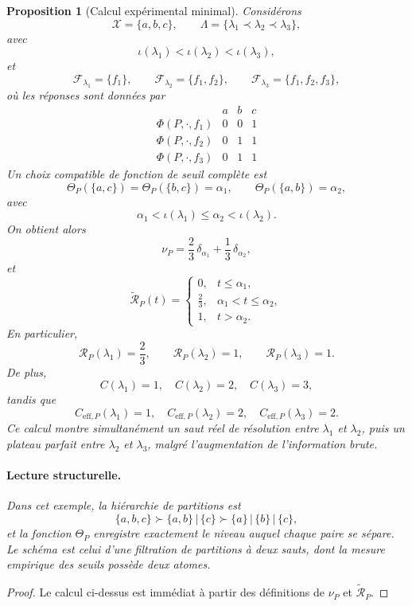 \documentclass[11pt,a4paper,openany]{book}
\newtheorem{proposition}[definition]{Proposition}
\begin{document}
\begin{proposition}[Calcul expérimental minimal]
Considérons
\[
\mathcal X=\{a,b,c\},\qquad \Lambda=\{\lambda_1\prec\lambda_2\prec\lambda_3\},
\]
avec
\[
\iota(\lambda_1)<\iota(\lambda_2)<\iota(\lambda_3),
\]
et
\[
\mathcal F_{\lambda_1}=\{f_1\},\qquad
\mathcal F_{\lambda_2}=\{f_1,f_2\},\qquad
\mathcal F_{\lambda_3}=\{f_1,f_2,f_3\},
\]
où les réponses sont données par
\[
\begin{array}{c|ccc}
& a & b & c \\ \hline
\Phi(P,\cdot,f_1) & 0 & 0 & 1 \\
\Phi(P,\cdot,f_2) & 0 & 1 & 1 \\
\Phi(P,\cdot,f_3) & 0 & 1 & 1
\end{array}
\]
Un choix compatible de fonction de seuil complète est
\[
\Theta_P(\{a,c\})=\Theta_P(\{b,c\})=\alpha_1,
\qquad
\Theta_P(\{a,b\})=\alpha_2,
\]
avec
\[
\alpha_1<\iota(\lambda_1)\le \alpha_2<\iota(\lambda_2).
\]
On obtient alors
\[
\nu_P=\frac23\,\delta_{\alpha_1}+\frac13\,\delta_{\alpha_2},
\]
et
\[
\widetilde{\mathcal R}_P(t)=
\begin{cases}
0,& t\le \alpha_1,\\[0.2em]
\frac23,& \alpha_1<t\le \alpha_2,\\[0.2em]
1,& t>\alpha_2.
\end{cases}
\]
En particulier,
\[
\mathcal R_P(\lambda_1)=\frac23,\qquad
\mathcal R_P(\lambda_2)=1,\qquad
\mathcal R_P(\lambda_3)=1.
\]
De plus,
\[
C(\lambda_1)=1,\quad C(\lambda_2)=2,\quad C(\lambda_3)=3,
\]
tandis que
\[
C_{\mathrm{eff},P}(\lambda_1)=1,\quad
C_{\mathrm{eff},P}(\lambda_2)=2,\quad
C_{\mathrm{eff},P}(\lambda_3)=2.
\]
Ce calcul montre simultanément un saut réel de résolution entre \(\lambda_1\) et \(\lambda_2\), puis un plateau parfait entre \(\lambda_2\) et \(\lambda_3\), malgré l'augmentation de l'information brute.

\paragraph{Lecture structurelle.}
Dans cet exemple, la hiérarchie de partitions est
\[
\{a,b,c\}
\succ
\{a,b\}\,|\,\{c\}
\succ
\{a\}\,|\,\{b\}\,|\,\{c\},
\]
et la fonction \(\Theta_P\) enregistre exactement le niveau auquel chaque paire se sépare. Le schéma est celui d'une filtration de partitions à deux sauts, dont la mesure empirique des seuils possède deux atomes.
\end{proposition}

\begin{proof}
Le calcul ci-dessus est immédiat à partir des définitions de \(\nu_P\) et \(\widetilde{\mathcal R}_P\).
\end{proof}
\end{document}
